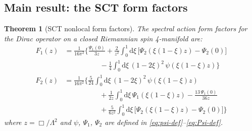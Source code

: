\documentclass[11pt,a4paper]{article}
\renewcommand{\dd}{\mathrm{d}}
\newtheorem{theorem}{Theorem}[section]
\theoremstyle{definition}
\theoremstyle{remark}
\begin{document}
\subsection{Main result: the SCT form factors}

\begin{theorem}[SCT nonlocal form factors]
\label{thm:main}
The spectral action form factors for the Dirac operator on a closed
Riemannian spin 4-manifold are:
\begin{equation}
  \boxed{
  \begin{aligned}
  F_1(z) &= \frac{1}{16\pi^2}\Biggl\{
  \frac{\Psi_1(0)}{3z}
  + \frac{2}{z^2}\int_0^1\dd\xi\,
    \bigl[\Psi_2(\xi(1-\xi)z) - \Psi_2(0)\bigr]\\
  &\qquad\qquad\quad
  - \frac{1}{4}\int_0^1\dd\xi\,(1-2\xi)^2\,
    \psi(\xi(1-\xi)z)
  \Biggr\}
  \end{aligned}
  }
  \label{eq:F1-main}
\end{equation}
\begin{equation}
  \boxed{
  \begin{aligned}
  F_2(z) &= \frac{1}{16\pi^2}\Biggl\{
  \frac{5}{24}\int_0^1\dd\xi\,(1-2\xi)^2\,\psi(\xi(1-\xi)z)\\
  &\qquad\qquad\quad
  + \frac{1}{2z}\int_0^1\dd\xi\,\Psi_1(\xi(1-\xi)z)
  - \frac{13\,\Psi_1(0)}{36z}\\
  &\qquad\qquad\quad
  + \frac{5}{6z^2}\int_0^1\dd\xi\,
    \bigl[\Psi_2(\xi(1-\xi)z) - \Psi_2(0)\bigr]
  \Biggr\}
  \end{aligned}
  }
  \label{eq:F2-main}
\end{equation}
where $z = \Box/\Lambda^2$ and $\psi$, $\Psi_1$, $\Psi_2$ are
defined in \eqref{eq:psi-def}--\eqref{eq:Psi-def}.
\end{theorem}
\end{document}
